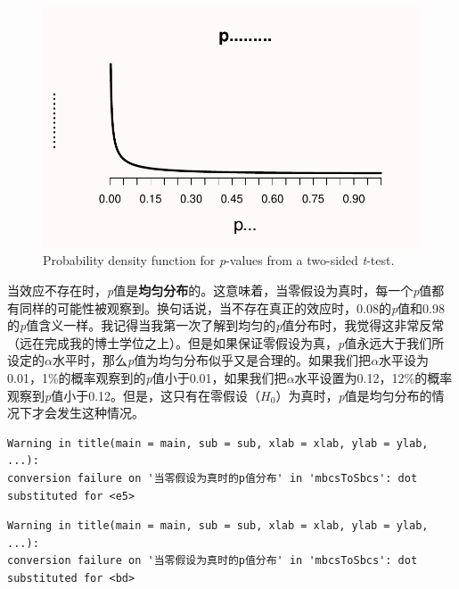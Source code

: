 \documentclass[
  letterpaper,
  DIV=11,
  numbers=noendperiod]{scrreprt}
\begin{document}
\begin{figure}

{\centering \includegraphics[width=1\textwidth,height=\textheight]{01-pvalue_files/figure-pdf/fig-pdft-1.pdf}

}

\caption{\label{fig-pdft}Probability density function for
\emph{p}-values from a two-sided \emph{t}-test.}

\end{figure}

当效应不存在时，\emph{p}值是\textbf{均匀分布}的。这意味着，当零假设为真时，每一个\emph{p}值都有同样的可能性被观察到。换句话说，当不存在真正的效应时，0.08的\emph{p}值和0.98的\emph{p}值含义一样。我记得当我第一次了解到均匀的\emph{p}值分布时，我觉得这非常反常（远在完成我的博士学位之上）。但是如果保证零假设为真，\emph{p}值永远大于我们所设定的\(\alpha\)水平时，那么\emph{p}值为均匀分布似乎又是合理的。如果我们把\(\alpha\)水平设为0.01，1\%的概率观察到的\emph{p}值小于0.01，如果我们把\(\alpha\)水平设置为0.12，12\%的概率观察到\emph{p}值小于0.12。但是，这只有在零假设（\(H_0\)）为真时，\emph{p}值是均匀分布的情况下才会发生这种情况。

\begin{verbatim}
Warning in title(main = main, sub = sub, xlab = xlab, ylab = ylab, ...):
conversion failure on '当零假设为真时的p值分布' in 'mbcsToSbcs': dot
substituted for <e5>
\end{verbatim}

\begin{verbatim}
Warning in title(main = main, sub = sub, xlab = xlab, ylab = ylab, ...):
conversion failure on '当零假设为真时的p值分布' in 'mbcsToSbcs': dot
substituted for <bd>
\end{verbatim}
\end{document}
